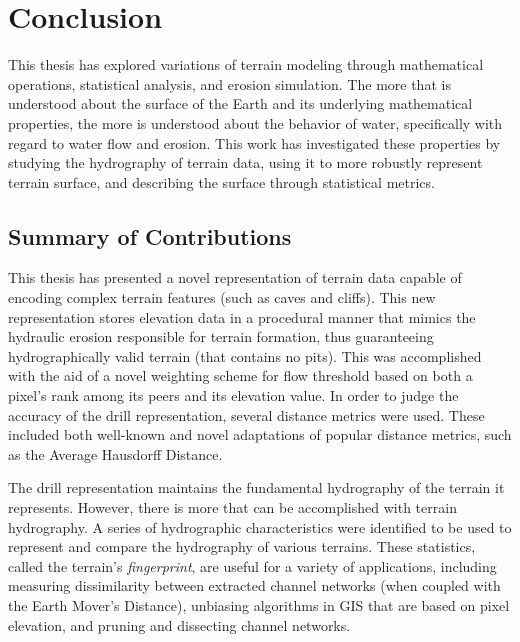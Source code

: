\chapter{Conclusion}
\label{chapter:ConclusionAndDiscussion}

This thesis has explored variations of terrain modeling through mathematical operations, statistical analysis, and erosion simulation. 
The more that is understood about the surface of the Earth and its underlying mathematical properties, the more is understood about the behavior of water, specifically with regard to water flow and erosion.
This work has investigated these properties by studying the hydrography of terrain data, using it to more robustly represent terrain surface, and describing the surface through statistical metrics. 


\section{Summary of Contributions}


This thesis has presented a novel representation of terrain data capable of encoding complex terrain features (such as caves and cliffs). This new representation stores elevation data in a procedural manner that mimics the hydraulic erosion responsible for terrain formation, thus guaranteeing hydrographically valid terrain (that contains no pits). This was accomplished with the aid of a novel weighting scheme for flow threshold based on both a pixel's rank among its peers and its elevation value.
% 
In order to judge the accuracy of the drill representation, several distance metrics were used. These included both well-known and novel adaptations of popular distance metrics, such as the Average Hausdorff Distance. 

The drill representation maintains the fundamental hydrography of the terrain it represents. However, there is more that can be accomplished with terrain hydrography. A series of hydrographic characteristics were identified to be used to represent and compare the hydrography of various terrains. These statistics, called the terrain's \textit{fingerprint}, are useful for a variety of applications, including measuring dissimilarity between extracted channel networks (when coupled with the Earth Mover's Distance), unbiasing algorithms in GIS that are based on pixel elevation, and pruning and dissecting channel networks. 

